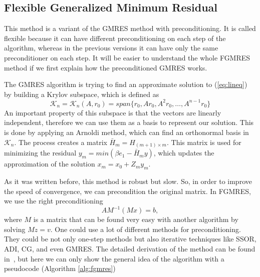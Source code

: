 \subsection{Flexible Generalized Minimum Residual}

This method is a variant of the GMRES method with preconditioning. It is called flexible because it can have different preconditioning on each step of the algorithm, whereas in the previous versions it can have only the same preconditioner on each step. It will be easier to understand the whole FGMRES method if we first explain how the preconditioned GMRES works.

The GMRES algorithm is trying to find an approximate solution to (\ref{eq:lineq}) by building a Krylov subspace, which is defined as
\begin{equation}
    \mathcal{K}_n = \mathcal{K}_n (A, r_0) = span \{ r_0, Ar_0, A^2r_0,\hdots, A^{n-1}r_0 \}
\end{equation}
An important property of this subspace is that the vectors are linearly independent, therefore we can use them as a basis to represent our solution. This is done by applying an Arnoldi method, which can find an orthonormal basis in $\mathcal{K}_n$. The process creates a matrix $\bar{H}_m = H_{(m+1)\times m}$. This matrix is used for minimizing the residual $y_m = min(\beta e_1 - \bar{H}_m y)$, which updates the approximation of the solution $x_m = x_0 + Z_my_m$.

As it was written before, this method is robust but slow. So, in order to improve the speed of convergence, we can precondition the original matrix. In FGMRES, we use the right preconditioning
\begin{equation}
    AM^{-1}(Mx) = b,
\end{equation}
where $M$ is a matrix that can be found very easy with another algorithm by solving $Mz = v$. One could use a lot of different methods for preconditioning. They could be not only one-step methods but also iterative techniques like SSOR, ADI, CG, and even GMRES. The detailed derivation of the method can be found in~\cite{fgmresart}, but here we can only show the general idea of the algorithm with a pseudocode (Algorithm \ref{alg:fgmres})

